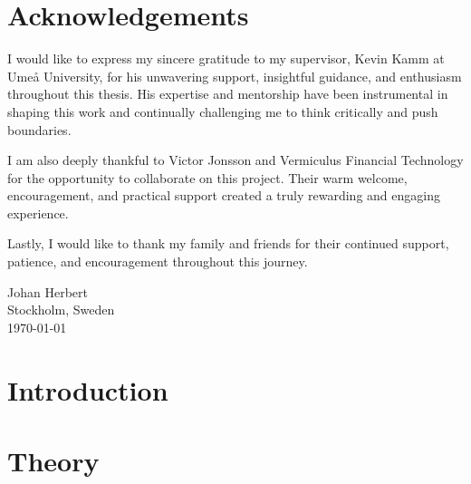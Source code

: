 \documentclass[%
a4paper,							
11pt,								
bibliography=totoc,						
abstracton=true					
]
{scrartcl}
\theoremstyle{plain}
\theoremstyle{definition}
\theoremstyle{remark}
\newcommand{\1}{\mathbbm{1}}
\begin{document}
\section*{Acknowledgements}
I would like to express my sincere gratitude to my supervisor, Kevin Kamm at Umeå University, for his unwavering support, insightful guidance, and enthusiasm throughout this thesis. His expertise and mentorship have been instrumental in shaping this work and continually challenging me to think critically and push boundaries.

I am also deeply thankful to Victor Jonsson and Vermiculus Financial Technology for the opportunity to collaborate on this project. Their warm welcome, encouragement, and practical support created a truly rewarding and engaging experience.

Lastly, I would like to thank my family and friends for their continued support, patience, and encouragement throughout this journey.  

Johan Herbert\\
Stockholm, Sweden\\
\today 

\newpage
\clearpage
\newpage
{\hypersetup{linkcolor=black}
\tableofcontents
}
\newpage
{}
\pagestyle{scrheadings}



\section{Introduction}\label{sec:Introduction}



\section{Theory}\label{sec:theory}

\end{document}
